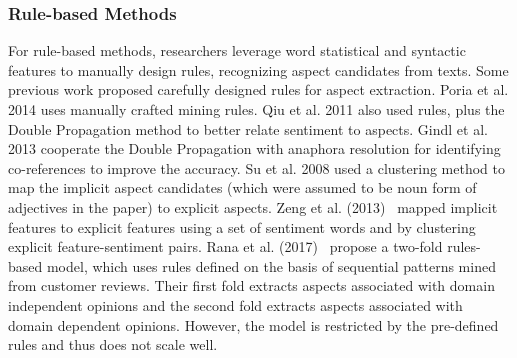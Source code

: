 \subsubsection{Rule-based Methods}
For rule-based methods, researchers leverage word statistical and syntactic features 
to manually design rules, recognizing aspect candidates from texts.
Some previous work proposed carefully designed rules 
for aspect extraction.
Poria et al. 2014 \cite{poria2014rule} uses manually crafted mining rules. 
Qiu et al. 2011 \cite{qiu2011opinion} also used rules, plus the 
Double Propagation method to better relate sentiment to aspects. 
Gindl et al. 2013 \cite{gindl2013rule} cooperate the Double Propagation 
 with anaphora resolution for identifying 
co-references to improve the accuracy. 
Su et al. 2008 \cite{su2008hidden} used a clustering method to map 
the implicit aspect candidates (which were assumed to be noun form 
of adjectives in the paper) to explicit aspects. 
Zeng et al. (2013)~\cite{zeng2013classification} mapped implicit features to explicit 
features using a set of sentiment words and by clustering explicit 
feature-sentiment pairs.
Rana et al. (2017)~\cite{rana2017two} propose a two-fold rules-based model, which uses rules defined on the basis of sequential patterns mined from customer reviews. Their first fold extracts aspects associated with domain independent opinions and the second fold extracts aspects associated with domain dependent opinions. 
However, the model is restricted by the pre-defined rules and thus does not scale well.
